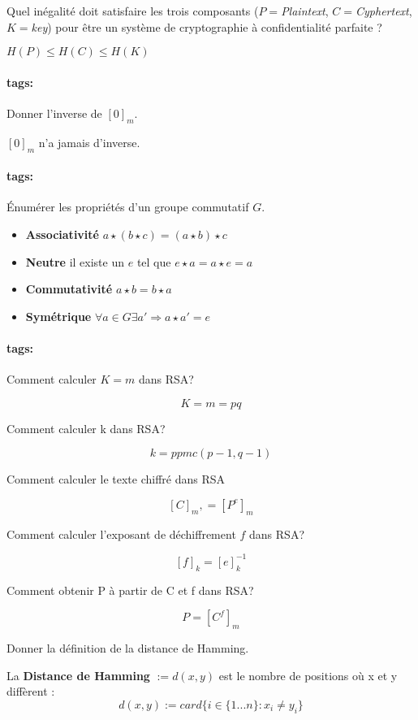 \documentclass[12pt]{article}
\newcommand*{\xfield}[1]{\begin{mdframed}\centering #1\end{mdframed}\bigskip}
\newenvironment{note}{}{}
\newcommand*{\tags}[1]{\paragraph{tags: }#1}
\begin{document}
\begin{note}
	\xfield{Quel inégalité doit satisfaire les trois composants ($P=$\textit{Plaintext}, $C=$\textit{Cyphertext}, $K=$\textit{key}) pour être un système de cryptographie à confidentialité parfaite ?}
	\xfield{$H(P)\le H(C) \le H(K)$}
\end{note}

\begin{note}
	\tags{}
	\xfield{
		Donner l'inverse de $[0]_m$.
	}
	\xfield{
		$[0]_m$ n'a jamais d'inverse.
	}
\end{note}

\begin{note}
	\tags{}
	\xfield{
		Énumérer les propriétés d'un groupe commutatif $G$.
	}
	\xfield{
		\begin{itemize}
		\item \textbf{Associativité} $a \star (b \star c) = (a \star b) \star c$
		\item \textbf{Neutre} il existe un $e$ tel que $e \star a = a \star e = a$
		\item \textbf{Commutativité} $a \star b = b \star a$
		\item \textbf{Symétrique} $\forall a \in G \exists a' \Rightarrow a \star a' = e$
		\end{itemize}
	}
\end{note}

\begin{note}
	\tags{}
	\xfield{
		Comment calculer $K = m$ dans RSA?
	}
	\xfield{
		$$K = m = pq$$
	}
\end{note}

\begin{note}
\xfield{Comment calculer k dans RSA?}
\xfield{$$k = ppmc(p-1,q-1)$$}
\end{note}

\begin{note}
\xfield{Comment calculer le texte chiffré dans RSA}
\xfield{$$[C]_m, = [P^{e}]_m$$}
\end{note}

\begin{note}
\xfield{Comment calculer l'exposant de déchiffrement $f$ dans RSA?}
\xfield{$$[f]_k = [e]_{k}^{-1}$$}
\end{note}

\begin{note}
\xfield{Comment obtenir P à partir de C et f dans RSA?}
\xfield{$$P = [C^f]_m$$}
\end{note}

\begin{note}
\xfield{Donner la définition de la distance de Hamming.}
\xfield{La \textbf{Distance de Hamming} $:= d(x,y)$ est le nombre de positions où x et y diffèrent : \
$$d(x,y) := card\{i \in \{1...n\} : x_i \neq y_i\}$$
}
\end{note}
\end{document}

